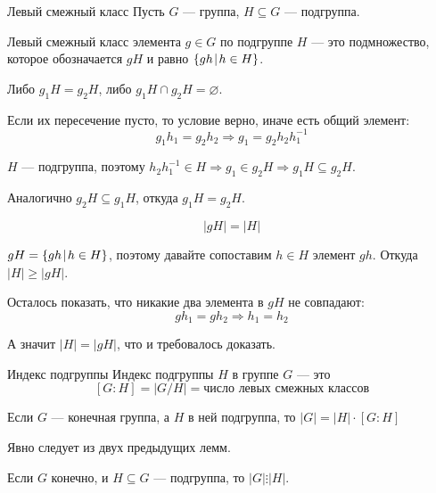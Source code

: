 \begin{defn}{Левый смежный класс}{}
    Пусть \( G \) --- группа, \( H \subseteq G \) --- подгруппа.

    Левый смежный класс элемента \( g \in G \) по подгруппе \( H \) --- это подмножество,
    которое обозначается \( gH \) и равно \( \{ gh \: \vline \: h \in H \} \).
\end{defn}

\newpage

\begin{lemma}{}{}
    Либо \( g_1 H = g_2 H \), либо \( g_1 H \cap g_2 H = \varnothing \).
\end{lemma}

Если их пересечение пусто, то условие верно, иначе есть общий элемент:
\[
    g_1 h_1 = g_2 h_2 \Rightarrow g_1 = g_2 h_2 h_1^{-1}
\]

\( H \) --- подгруппа, поэтому \( h_2 h_1^{-1} \in H \Rightarrow g_1 \in g_2 H \Rightarrow g_1 H \subseteq g_2 H \).

Аналогично \( g_2 H \subseteq g_1 H \), откуда \( g_1 H = g_2 H \).

\begin{lemma}{}{}
    \[
        |gH| = |H|
    \]
\end{lemma}

\( gH = \{ gh \: \vline \: h \in H \} \),
поэтому давайте сопоставим \( h \in H \) элемент \( gh \).
Откуда \( |H| \geq |gH| \).

Осталось показать, что никакие два элемента в \( gH \) не совпадают:
\[
    g h_1 = g h_2 \Rightarrow h_1 = h_2
\]

А значит \( |H| = |gH| \), что и требовалось доказать.

\begin{defn}{Индекс подгруппы}{}
    Индекс подгруппы \( H \) в группе \( G \) --- это
    \[
        [ G : H ] = | G / H | = \text{число левых смежных классов}
    \]
\end{defn}

\begin{thrm}{}{}
    Если \( G \) --- конечная группа, а \( H \) в ней подгруппа,
    то \( |G| = |H| \cdot [G : H] \)
\end{thrm}

Явно следует из двух предыдущих лемм.

\begin{coroll}{}{}
    Если \( G \) конечно, и \( H \subseteq G \) --- подгруппа,
    то \( |G| \vdots |H| \).
\end{coroll}

